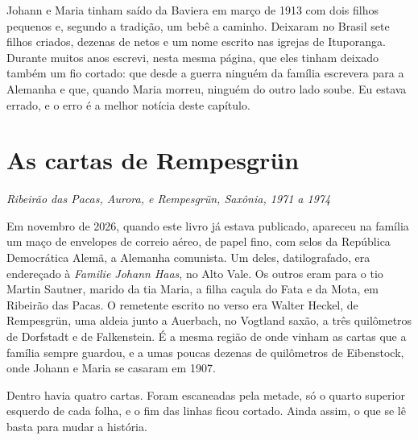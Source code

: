 \documentclass[
  brazilian,
  11pt,
  openany]{book}
\begin{document}
Johann e Maria tinham saído da Baviera em março de 1913 com dois filhos
pequenos e, segundo a tradição, um bebê a caminho. Deixaram no Brasil
sete filhos criados, dezenas de netos e um nome escrito nas igrejas de
Ituporanga. Durante muitos anos escrevi, nesta mesma página, que eles
tinham deixado também um fio cortado: que desde a guerra ninguém da
família escrevera para a Alemanha e que, quando Maria morreu, ninguém do
outro lado soube. Eu estava errado, e o erro é a melhor notícia deste
capítulo.

\section{As cartas de Rempesgrün}\label{as-cartas-de-rempesgruxfcn}

\emph{Ribeirão das Pacas, Aurora, e Rempesgrün, Saxônia, 1971 a 1974}

Em novembro de 2026, quando este livro já estava publicado, apareceu na
família um maço de envelopes de correio aéreo, de papel fino, com selos
da República Democrática Alemã, a Alemanha comunista. Um deles,
datilografado, era endereçado à \emph{Familie Johann Haas}, no Alto
Vale. Os outros eram para o tio Martin Sautner, marido da tia Maria, a
filha caçula do Fata e da Mota, em Ribeirão das Pacas. O remetente
escrito no verso era Walter Heckel, de Rempesgrün, uma aldeia junto a
Auerbach, no Vogtland saxão, a três quilômetros de Dorfstadt e de
Falkenstein. É a mesma região de onde vinham as cartas que a família
sempre guardou, e a umas poucas dezenas de quilômetros de Eibenstock,
onde Johann e Maria se casaram em 1907.

Dentro havia quatro cartas. Foram escaneadas pela metade, só o quarto
superior esquerdo de cada folha, e o fim das linhas ficou cortado. Ainda
assim, o que se lê basta para mudar a história.
\end{document}
